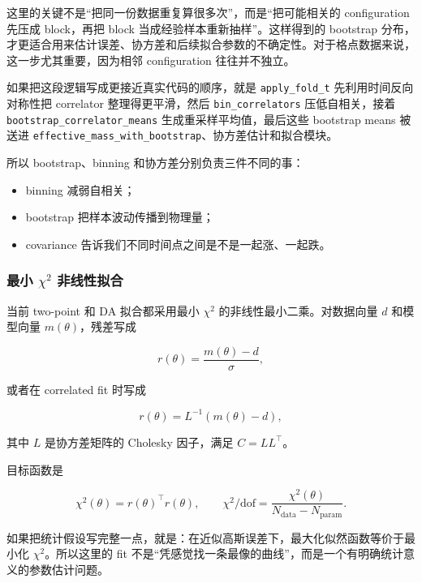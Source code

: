 \documentclass[11pt,a4paper,fontset=fandol]{ctexart}
\begin{document}
这里的关键不是“把同一份数据重复算很多次”，而是“把可能相关的 configuration 先压成 block，再把 block 当成经验样本重新抽样”。这样得到的 bootstrap 分布，才更适合用来估计误差、协方差和后续拟合参数的不确定性。对于格点数据来说，这一步尤其重要，因为相邻 configuration 往往并不独立。

如果把这段逻辑写成更接近真实代码的顺序，就是 \lstinline|apply_fold_t| 先利用时间反向对称性把 correlator 整理得更平滑，然后 \lstinline|bin_correlators| 压低自相关，接着 \lstinline|bootstrap_correlator_means| 生成重采样平均值，最后这些 bootstrap means 被送进 \lstinline|effective_mass_with_bootstrap|、协方差估计和拟合模块。

所以 bootstrap、binning 和协方差分别负责三件不同的事：

\begin{itemize}[leftmargin=2em]
  \item binning 减弱自相关；
  \item bootstrap 把样本波动传播到物理量；
  \item covariance 告诉我们不同时间点之间是不是一起涨、一起跌。
\end{itemize}

\subsubsection{最小 \texorpdfstring{$\chi^2$}{chi2} 非线性拟合}

当前 two-point 和 DA 拟合都采用最小 $\chi^2$ 的非线性最小二乘。对数据向量 $d$ 和模型向量 $m(\theta)$，残差写成

\begin{equation}
r(\theta) = \frac{m(\theta)-d}{\sigma},
\end{equation}

或者在 correlated fit 时写成

\begin{equation}
r(\theta) = L^{-1}\!\left(m(\theta)-d\right),
\end{equation}

其中 $L$ 是协方差矩阵的 Cholesky 因子，满足 $C = LL^\top$。

目标函数是

\begin{equation}
\chi^2(\theta) = r(\theta)^\top r(\theta),
\qquad
\chi^2/\mathrm{dof} = \frac{\chi^2(\theta)}{N_{\mathrm{data}} - N_{\mathrm{param}}}.
\end{equation}

如果把统计假设写完整一点，就是：在近似高斯误差下，最大化似然函数等价于最小化 $\chi^2$。所以这里的 fit 不是“凭感觉找一条最像的曲线”，而是一个有明确统计意义的参数估计问题。
\end{document}
